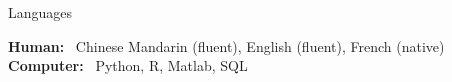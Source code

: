\documentclass[usegeometry, 10pt, a4paper]{cv} %
\newcommand{\activite}[1]{\textbf{#1}\ }
\begin{document}
\begin{rubriquetableau}[12 cm]{Languages}\\
  \vspace{-0.5cm}

\activite{Human:} Chinese Mandarin (fluent), English (fluent), French (native)\\

\activite{Computer:} Python, \textsf{R}, Matlab, SQL \\ 
\end{rubriquetableau}


\end{document}

